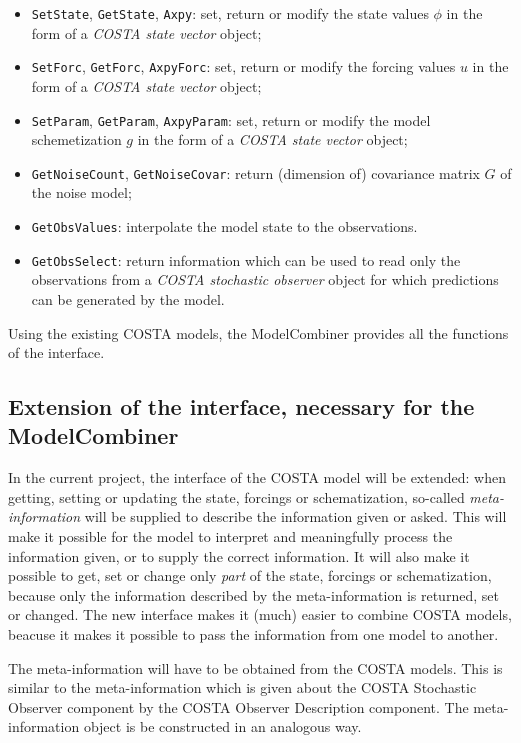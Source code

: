 \documentclass[a4paper,12pt]{article}
\begin{document}
\begin{itemize}
 \item {\tt SetState}, {\tt GetState}, {\tt Axpy}: 
                      set, return or modify the state values $\phi$
                      in the form of a {\em COSTA state vector} object;
 \item {\tt SetForc}, {\tt GetForc}, {\tt AxpyForc}: 
                      set, return or modify the forcing values $u$
                      in the form of a {\em COSTA state vector} object;
 \item {\tt SetParam}, {\tt GetParam}, {\tt AxpyParam}: 
                      set, return or modify the model schemetization $g$
                      in the form of a {\em COSTA state vector} object; 
\item {\tt GetNoiseCount}, {\tt GetNoiseCovar}: 
                      return (dimension of) covariance matrix $G$ of the 
                      noise model;
 \item {\tt GetObsValues}: interpolate the model state to the observations.
 \item {\tt GetObsSelect}: return information which can be used to
                      read only the observations from a 
                      {\em COSTA stochastic observer} object for which
                      predictions can be generated by the model.
\end{itemize}

Using the existing COSTA models, the ModelCombiner provides all the 
functions of the interface.


\subsection{Extension of the interface, necessary for the ModelCombiner}
In the current project, the interface of the COSTA model will be extended:
when getting, setting or updating the state, forcings or schematization,
so-called {\em meta-information} will be supplied to describe the
information given or asked. This will make it possible for the model to
interpret and meaningfully process the information given, or to supply the
correct information. It will also make it possible to get, set or change
only {\em part} of the state, forcings or schematization, because only the
information described by the meta-information is returned, set or changed.
The new interface makes it (much) easier to combine COSTA models,
beacuse it makes it possible to pass the information from one model to
another. 

The meta-information will have to be obtained from the COSTA models. 
This is similar to the meta-information which is given about the COSTA
Stochastic Observer component by the COSTA Observer Description component.  
The meta-information object is be constructed in an analogous way.
\end{document}
